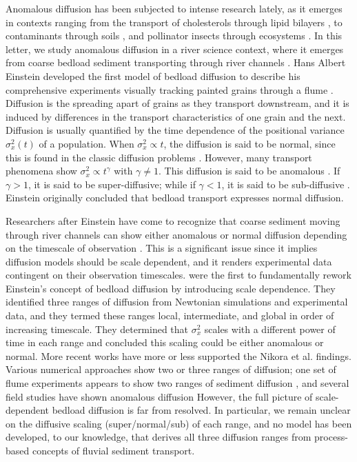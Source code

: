 \documentclass[]{agujournal2018}
\begin{document}
Anomalous diffusion has been subjected to intense research lately, as it emerges in contexts ranging from the transport of cholesterols through lipid bilayers \citep{Jeon2012,Molina-Garcia2018}, to contaminants through soils \citep{Berkowitz2006,Yang2019}, and pollinator insects through ecosystems \citep{Reynolds2009,Vallaeys2017}.
In this letter, we study anomalous diffusion in a river science context, where it emerges from coarse bedload sediment transporting through river channels \citep{Bradley2017,Martin2012,Ganti2010}.
Hans Albert Einstein developed the first model of bedload diffusion to describe his comprehensive experiments visually tracking painted grains through a flume \citep{Ettema2004,Einstein1937}.
Diffusion is the spreading apart of grains as they transport downstream, and it is induced by differences in the transport characteristics of one grain and the next.
Diffusion is usually quantified by the time dependence of the positional variance $\sigma_x^2(t)$ of a population.
When $\sigma_x^2 \propto t$, the diffusion is said to be normal, since this is found in the classic diffusion problems \citep[e.g.][]{Einstein1905,Taylor1920}.
However, many transport phenomena show $\sigma_x^2 \propto t^\gamma$ with $\gamma \neq 1$.
This diffusion is said to be anomalous \citep{Sokolov2012}. 
If $\gamma>1$, it is said to be super-diffusive; while if $\gamma <1$, it is said to be sub-diffusive \citep{Metzler2000}.
Einstein originally concluded that bedload transport expresses normal diffusion.

Researchers after Einstein have come to recognize that coarse sediment moving through river channels can show either anomalous or normal diffusion depending on the timescale of observation \citep{Nikora2002}.
This is a significant issue since it implies diffusion models should be scale dependent, and it renders experimental data contingent on their observation timescales.
\citet{Nikora2001a,Nikora2002} were the first to fundamentally rework Einstein's concept of bedload diffusion by introducing scale dependence.
They identified three ranges of diffusion from Newtonian simulations and experimental data, and they termed these ranges local, intermediate, and global in order of increasing timescale.
They determined that $\sigma_x^2$ scales with a different power of time in each range and concluded this scaling could be either anomalous or normal.
More recent works have more or less supported the Nikora et al. findings.
Various numerical approaches show two \citep[e.g.][]{Fan2016} or three \citep[e.g.][]{Bialik2012,Zhang2012} ranges of diffusion; one set of flume experiments appears to show two ranges of sediment diffusion \citep{Martin2012}, and several field studies have shown anomalous diffusion \citep{Bradley2017, Phillips2013}
However, the full picture of scale-dependent bedload diffusion is far from resolved.
In particular, we remain unclear on the diffusive scaling (super/normal/sub) of each range, and no model has been developed, to our knowledge, that derives all three diffusion ranges from process-based concepts of fluvial sediment transport.
\end{document}
